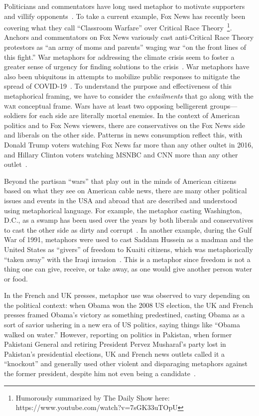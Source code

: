 \documentclass[12pt,letterpaper]{article}
\begin{document}
Politicians and commentators have long used metaphor to motivate
supporters and villify opponents~\cite{Charteris-Black2009}. 
To take a current example, Fox News has
recently been covering what they call ``Classroom Warfare'' over
Critical Race Theory~\footnote{Humorously summarized by The Daily Show here: \\
https://www.youtube.com/watch?v=7sGK33uTOpU}.
Anchors and commentators on Fox News variously cast anti-Critical Race Theory
protestors as ``an army of moms and parents'' waging war ``on the front lines
of this fight.'' 
War metaphors for addressing the climate crisis seem to foster a greater
sense of urgency for finding solutions to the crisis~\cite{Flusberg2018}. 
War metaphors have also been ubiquitous in attempts to mobilize public 
responses to mitigate the spread of COVID-19~\cite{CastroSeixas2021}. 
To understand the purpose and effectiveness of this metaphorical framing, 
we have to consider the \emph{entailments} that go
along with the \textsc{war} conceptual frame. Wars have at least two opposing
belligerent groups---
soldiers for each side are literally mortal enemies. 
In the context of American politics and to Fox News viewers, there
are conservatives on the Fox News side and liberals on the other side. 
Patterns in news consumption reflect this, with Donald Trump
voters watching Fox News far more than any other oultet in 2016, and 
Hillary Clinton voters watching MSNBC and CNN more than any other 
outlet~\cite{Prior2013,Pew2014PolarizationAndMediaHabits,Pew2017TrumpClinton}.

Beyond the partisan ``wars'' that play out in the minds of American citizens
based on what they see on American cable news, there are many
other political issues and events in the USA and abroad that are 
described and understood using metaphorical language. 
For example, the metaphor casting Washington, D.C.,
as a swamp has been used over the years by both liberals and conservatives 
to cast the other side as dirty and corrupt~\cite{Burgers2019}.
In another example, during the Gulf War of 1991, metaphors were
used to cast Saddam Hussein as a madman and the United States as ``givers''
of freedom to Kuaiti citizens, which was metaphorically ``taken away''
with the Iraqi invasion~\cite{Lakoff1991}. 
This is a metaphor since freedom
is not a thing one can give, receive, or take away, 
as one would give another person water or food.


In the French and UK presses, metaphor use was observed to vary depending on the
political context: when Obama won the 2008 US election,
the UK and French presses framed Obama's victory as something predestined,
casting Obama as a sort of savior ushering in a new era of US politics, 
saying things like ``Obama walked on water.'' However, reporting on politics in Pakistan,
when former Pakistani General and retiring President Pervez Musharaf's party 
lost in Pakistan's presidential elections, UK and French news outlets 
called it a ``knockout'' and generally used other violent and disparaging
metaphors against the former president, despite him not even being a 
candidate~\cite{Burnes2011}. 
\end{document}
